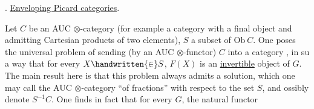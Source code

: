  . \uline{Enveloping Picard categories}.

Let $C$ be an  AUC $\otimes$-category (for example a category with a final object and admitting Cartesian products of two elements), $S$ a subset of $\mathrm{Ob}\ C$. One poses the universal problem of sending (by an AUC $\otimes$-functor) $C$ into a \inserted{$\otimes$-}category , in su a way that for every $X\handwritten{\in} S$, $F(X)$ is an \uline{invertible} object of $G$. The main result here is that this problem always admits a solution, which one may call the AUC $\otimes$-category ``of fractions'' with respect to the set $S$, and ossibly denote $S^{-1}C$. One finds in fact that for every $G$, the natural functor
